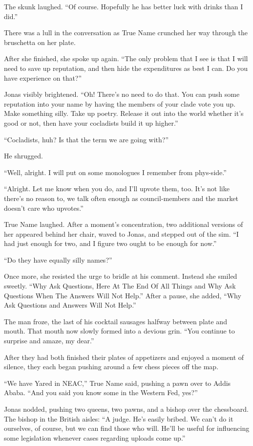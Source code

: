 The skunk laughed. ``Of course. Hopefully he has better luck with drinks than I did.''

There was a lull in the conversation as True Name crunched her way through the bruschetta on her plate.

After she finished, she spoke up again. ``The only problem that I see is that I will need to save up reputation, and then hide the expenditures as best I can. Do you have experience on that?''

Jonas visibly brightened. ``Oh! There's no need to do that. You can push some reputation into your name by having the members of your clade vote you up. Make something silly. Take up poetry. Release it out into the world whether it's good or not, then have your cocladists build it up higher.''

``Cocladists, huh? Is that the term we are going with?''

He shrugged.

``Well, alright. I will put on some monologues I remember from phys-side.''

``Alright. Let me know when you do, and I'll upvote them, too. It's not like there's no reason to, we talk often enough as council-members and the market doesn't care who upvotes.''

True Name laughed. After a moment's concentration, two additional versions of her appeared behind her chair, waved to Jonas, and stepped out of the sim. ``I had just enough for two, and I figure two ought to be enough for now.''

``Do they have equally silly names?''

Once more, she resisted the urge to bridle at his comment. Instead she smiled sweetly. ``Why Ask Questions, Here At The End Of All Things and Why Ask Questions When The Answers Will Not Help.'' After a pause, she added, ``Why Ask Questions and Answers Will Not Help.''

The man froze, the last of his cocktail sausages halfway between plate and mouth. That mouth now slowly formed into a devious grin. ``You continue to surprise and amaze, my dear.''

After they had both finished their plates of appetizers and enjoyed a moment of silence, they each began pushing around a few chess pieces off the map.

``We have Yared in NEAC,'' True Name said, pushing a pawn over to Addis Ababa. ``And you said you know some in the Western Fed, yes?''

Jonas nodded, pushing two queens, two pawns, and a bishop over the chessboard. The bishop in the British aisles: ``A judge. He's easily bribed. We can't do it ourselves, of course, but we can find those who will. He'll be useful for influencing some legislation whenever cases regarding uploads come up.''

